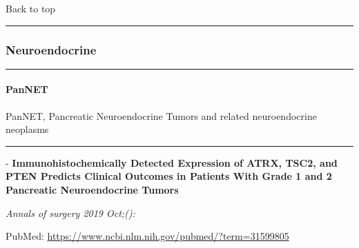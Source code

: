 \documentclass[
]{article}
\renewcommand{\linethickness}{0.05em}
\begin{document}
Back to top

\begin{center}\rule{0.5\linewidth}{\linethickness}\end{center}

\pagebreak

\hypertarget{neuroendocrine}{%
\subsubsection{Neuroendocrine}\label{neuroendocrine}}

\begin{center}\rule{0.5\linewidth}{\linethickness}\end{center}

\hypertarget{pannet}{%
\paragraph{PanNET}\label{pannet}}

PanNET, Pancreatic Neuroendocrine Tumors and related neuroendocrine
neoplasms

\begin{center}\rule{0.5\linewidth}{\linethickness}\end{center}

- \textbf{Immunohistochemically Detected Expression of ATRX, TSC2, and
PTEN Predicts Clinical Outcomes in Patients With Grade 1 and 2
Pancreatic Neuroendocrine Tumors}

\emph{Annals of surgery 2019 Oct;():}

PubMed: \url{https://www.ncbi.nlm.nih.gov/pubmed/?term=31599805}
\end{document}
